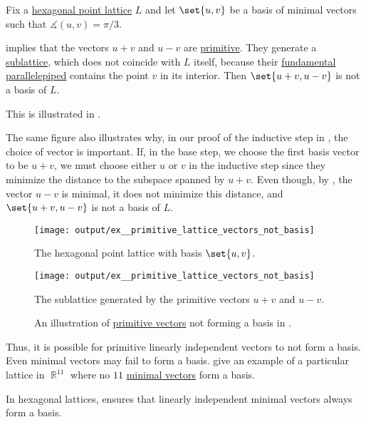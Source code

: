 \begin{example}\label{ex:primitive_lattice_vectors_not_basis}
  Fix a \hyperref[def:hexagonal_point_lattice]{hexagonal point lattice} \( L \) and let \( \set{ u, v } \) be a basis of minimal vectors such that \( \measuredangle(u, v) = \pi / 3 \).

   implies that the vectors \( u + v \) and \( u - v \) are \hyperref[def:primitive_lattice_vector]{primitive}. They generate a \hyperref[def:point_sublattice]{sublattice}, which does not coincide with \( L \) itself, because their \hyperref[def:fundamental_parallelotope]{fundamental parallelepiped} contains the point \( v \) in its interior. Then \( \set{ u + v, u - v } \) is not a basis of \( L \).

  This is illustrated in .

  The same figure also illustrates why, in our proof of the inductive step in , the choice of vector is important. If, in the base step, we choose the first basis vector to be \( u + v \), we must choose either \( u \) or \( v \) in the inductive step since they minimize the distance to the subspace spanned by \( u + v \). Even though, by , the vector \( u - v \) is minimal, it does not minimize this distance, and \( \set{ u + v, u - v } \) is not a basis of \( L \).

  \begin{figure}[!ht]
    \begin{subcaptionblock}{0.45\textwidth}
      \centering
      \texttt{[image: output/ex\_\_primitive\_lattice\_vectors\_not\_basis]}
      \caption{The hexagonal point lattice with basis \( \set{ u, v } \).}\label{fig:ex:primitive_lattice_vectors_not_basis/basis}
    \end{subcaptionblock}
    \hfill
    \begin{subcaptionblock}{0.45\textwidth}
      \centering
      \texttt{[image: output/ex\_\_primitive\_lattice\_vectors\_not\_basis]}
      \caption{The sublattice generated by the primitive vectors \( u + v \) and \( u - v \).}\label{fig:ex:primitive_lattice_vectors_not_basis/primitive}
    \end{subcaptionblock}
    \caption{An illustration of \hyperref[def:primitive_lattice_vector]{primitive vectors} not forming a basis in .}\label{fig:ex:primitive_lattice_vectors_not_basis}
  \end{figure}

  Thus, it is possible for primitive linearly independent vectors to not form a basis. Even minimal vectors may fail to form a basis.  give an example of a particular lattice in \( \BbbR^{11} \) where no \( 11 \) \hyperref[def:minimal_lattice_vector]{minimal vectors} form a basis.

  In hexagonal lattices,  ensures that linearly independent minimal vectors always form a basis.
\end{example}

